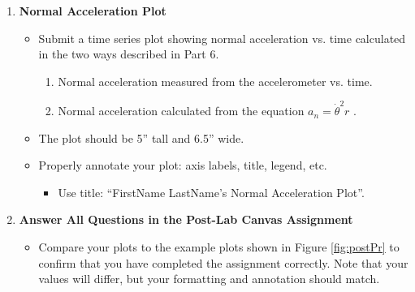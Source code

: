 \documentclass{article} %
\begin{document}
\begin{enumerate}
    \item \textbf{Normal Acceleration Plot}
    \begin{itemize}
        \item Submit a time series plot showing normal acceleration vs. time calculated in the two ways described in Part 6.
        \begin{enumerate}
            \item Normal acceleration measured from the accelerometer vs. time.
            \item Normal acceleration calculated from the equation $a_n = \dot{\theta}^2r$ .
        \end{enumerate}
        \item The plot should be 5'' tall and 6.5'' wide.
        \item Properly annotate your plot: axis labels, title, legend, etc.
        \begin{itemize}
            \item Use title: ``FirstName LastName's Normal Acceleration Plot''.
        \end{itemize}
    \end{itemize}
    

\item \textbf{Answer All Questions in the Post-Lab Canvas Assignment}
    \begin{itemize}
        \item Compare your plots to the example plots shown in Figure \ref{fig:postPr} to confirm that you have completed the assignment correctly. Note that your values will differ, but your formatting and annotation should match.
    \end{itemize}
\end{enumerate}


%
%

%
\end{document}
